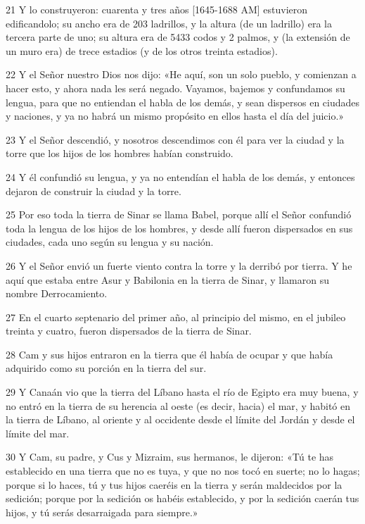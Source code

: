 \par 21 Y lo construyeron: cuarenta y tres años [1645-1688 AM] estuvieron edificandolo; su ancho era de 203 ladrillos, y la altura (de un ladrillo) era la tercera parte de uno; su altura era de 5433 codos y 2 palmos, y (la extensión de un muro era) de trece estadios (y de los otros treinta estadios).
\par 22 Y el Señor nuestro Dios nos dijo: «He aquí, son un solo pueblo, y comienzan a hacer esto, y ahora nada les será negado. Vayamos, bajemos y confundamos su lengua, para que no entiendan el habla de los demás, y sean dispersos en ciudades y naciones, y ya no habrá un mismo propósito en ellos hasta el día del juicio.»
\par 23 Y el Señor descendió, y nosotros descendimos con él para ver la ciudad y la torre que los hijos de los hombres habían construido.
\par 24 Y él confundió su lengua, y ya no entendían el habla de los demás, y entonces dejaron de construir la ciudad y la torre.
\par 25 Por eso toda la tierra de Sinar se llama Babel, porque allí el Señor confundió toda la lengua de los hijos de los hombres, y desde allí fueron dispersados ​​en sus ciudades, cada uno según su lengua y su nación.
\par 26 Y el Señor envió un fuerte viento contra la torre y la derribó por tierra. Y he aquí que estaba entre Asur y Babilonia en la tierra de Sinar, y llamaron su nombre Derrocamiento.
\par 27 En el cuarto septenario del primer año, al principio del mismo, en el jubileo treinta y cuatro, fueron dispersados ​​de la tierra de Sinar.
\par 28 Cam y sus hijos entraron en la tierra que él había de ocupar y que había adquirido como su porción en la tierra del sur.
\par 29 Y Canaán vio que la tierra del Líbano hasta el río de Egipto era muy buena, y no entró en la tierra de su herencia al oeste (es decir, hacia) el mar, y habitó en la tierra de Líbano, al oriente y al occidente desde el límite del Jordán y desde el límite del mar.
\par 30 Y Cam, su padre, y Cus y Mizraim, sus hermanos, le dijeron: «Tú te has establecido en una tierra que no es tuya, y que no nos tocó en suerte; no lo hagas; porque si lo haces, tú y tus hijos caeréis en la tierra y serán maldecidos por la sedición; porque por la sedición os habéis establecido, y por la sedición caerán tus hijos, y tú serás desarraigada para siempre.»
